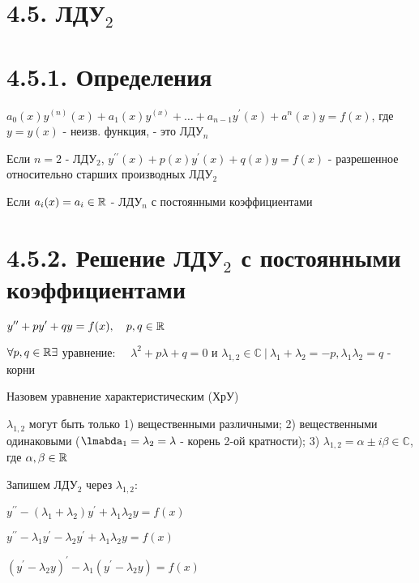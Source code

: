 \documentclass[12pt]{article}
\begin{document}
    \section{4.5. ЛДУ$\displaystyle _2$}


    \section{4.5.1. Определения}

    \Def $\displaystyle a_0(x) y^{(n)}(x) + a_1(x)y^{(x)} + \dots + a_{n - 1}y^\prime(x) + a^n(x)y = f(x)$, где $y = y(x)$ - неизв. функция, - это ЛДУ$\displaystyle _n$

    \Nota Если $n = 2$ - ЛДУ$\displaystyle _2$, $\displaystyle y^{\prime\prime}(x) + p(x)y^\prime(x) + q(x)y = f(x)$ - разрешенное относительно старших производных ЛДУ$\displaystyle _2$

    \Nota Если $\displaystyle a_i(x) = a_i \in \mathbb{R}$ - ЛДУ$\displaystyle _n$ с постоянными коэффициентами


    \section{4.5.2. Решение ЛДУ$\displaystyle _2$ с постоянными коэффициентами}

    $\displaystyle y^{\prime\prime} + p y^\prime + q y = f(x), \quad p, q \in \mathbb{R}$

    $\forall p, q \in \mathbb{R} \exists $ уравнение: $\displaystyle \quad \lambda^2 + p\lambda + q = 0$ и $\displaystyle \lambda_{1,2} \in \mathbb{C} \ | \ \lambda_1 + \lambda_2 = -p, \lambda_1 \lambda_2 = q$ - корни

    Назовем уравнение характеристическим (ХрУ) \Cat

    \Nota $\displaystyle \lambda_{1, 2}$ могут быть только
    1) вещественными различными;
    2) вещественными одинаковыми ($\displaystyle \lmabda_1 = \lambda_2 = \lambda$ - корень 2-ой кратности);
    3) $\displaystyle \lambda_{1,2} = \alpha \pm i \beta \in \mathbb{C}$, где $\alpha, \beta \in \mathbb{R}$

    Запишем ЛДУ$\displaystyle _2$ через $\displaystyle \lambda_{1, 2}$:

    $\displaystyle y^{\prime\prime} - (\lambda_1 + \lambda_2) y^\prime + \lambda_1 \lambda_2 y = f(x)$

    $\displaystyle y^{\prime\prime} - \lambda_1 y^\prime - \lambda_2 y^\prime + \lambda_1 \lambda_2 y = f(x)$

    $\displaystyle (y^\prime - \lambda_2 y)^\prime - \lambda_1 (y^\prime - \lambda_2 y) = f(x)$
\end{document}
